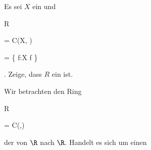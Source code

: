 
{}

{


Es sei $X$ ein
und


\mavergleichskettedisp

{\vergleichskette

{R
}

{ =} { C(X, \R)
}

{ =} { \left\{ f:X \longrightarrow \R  \mid  f          \right\}
}

{ } {
}

{ } {
}

}
{}{}{.}
Zeige, dass $R$ ein
ist.


}

{} {}



{}

{


Wir betrachten den Ring


\mavergleichskette

{\vergleichskette

{R
}

{ = }{ C(\R,\R)
}

{  }{
}

{    }{
}

{   }{
}

}
{}{}{}
der
von $\R$ nach $\R$. Handelt es sich um einen


}

{} {}



{}

